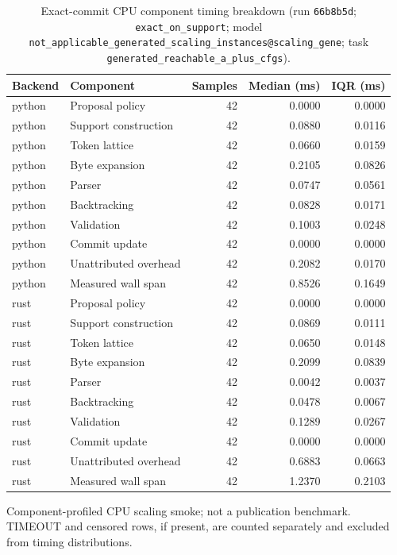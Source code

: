 \begin{table}[t]
\centering
\caption{Exact-commit CPU component timing breakdown (run \texttt{66b8b5d}; \texttt{exact\_on\_support}; model \texttt{not\_applicable\_generated\_scaling\_instances@scaling\_gene}; task \texttt{generated\_reachable\_a\_plus\_cfgs}).}
\label{tab:mwpc-runtime-breakdown}
\small
\begin{tabular}{llrrr}
\toprule
Backend & Component & Samples & Median (ms) & IQR (ms) \\
\midrule
python & Proposal policy & 42 & 0.0000 & 0.0000 \\
python & Support construction & 42 & 0.0880 & 0.0116 \\
python & Token lattice & 42 & 0.0660 & 0.0159 \\
python & Byte expansion & 42 & 0.2105 & 0.0826 \\
python & Parser & 42 & 0.0747 & 0.0561 \\
python & Backtracking & 42 & 0.0828 & 0.0171 \\
python & Validation & 42 & 0.1003 & 0.0248 \\
python & Commit update & 42 & 0.0000 & 0.0000 \\
python & Unattributed overhead & 42 & 0.2082 & 0.0170 \\
python & Measured wall span & 42 & 0.8526 & 0.1649 \\
\addlinespace
rust & Proposal policy & 42 & 0.0000 & 0.0000 \\
rust & Support construction & 42 & 0.0869 & 0.0111 \\
rust & Token lattice & 42 & 0.0650 & 0.0148 \\
rust & Byte expansion & 42 & 0.2099 & 0.0839 \\
rust & Parser & 42 & 0.0042 & 0.0037 \\
rust & Backtracking & 42 & 0.0478 & 0.0067 \\
rust & Validation & 42 & 0.1289 & 0.0267 \\
rust & Commit update & 42 & 0.0000 & 0.0000 \\
rust & Unattributed overhead & 42 & 0.6883 & 0.0663 \\
rust & Measured wall span & 42 & 1.2370 & 0.2103 \\
\bottomrule
\end{tabular}
\par\footnotesize Component-profiled CPU scaling smoke; not a publication benchmark. TIMEOUT and censored rows, if present, are counted separately and excluded from timing distributions.
\end{table}
